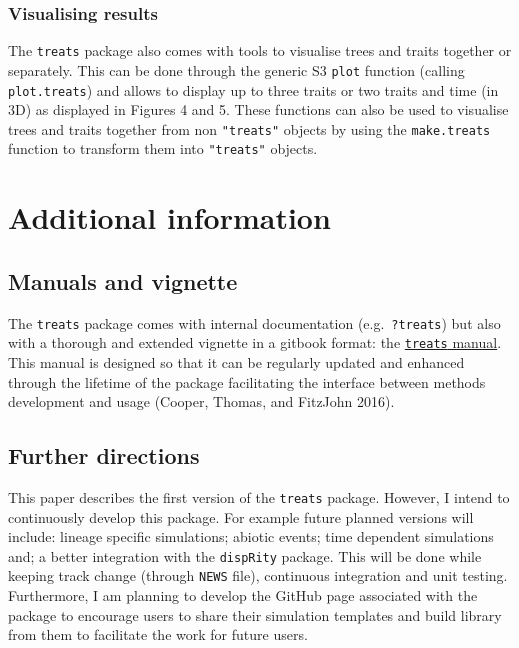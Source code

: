 \documentclass[
]{article}
\begin{document}
\hypertarget{visualising-results}{%
\subsubsection{Visualising results}\label{visualising-results}}

The \texttt{treats} package also comes with tools to visualise trees and
traits together or separately. This can be done through the generic S3
\texttt{plot} function (calling \texttt{plot.treats}) and allows to
display up to three traits or two traits and time (in 3D) as displayed
in Figures 4 and 5. These functions can also be used to visualise trees
and traits together from non \texttt{"treats"} objects by using the
\texttt{make.treats} function to transform them into \texttt{"treats"}
objects.

\hypertarget{additional-information}{%
\section{Additional information}\label{additional-information}}

\hypertarget{manuals-and-vignette}{%
\subsection{Manuals and vignette}\label{manuals-and-vignette}}

The \texttt{treats} package comes with internal documentation
(e.g.~\texttt{?treats}) but also with a thorough and extended vignette
in a gitbook format: the
\href{http://tguillerme.github.io/treats.html}{\texttt{treats} manual}.
This manual is designed so that it can be regularly updated and enhanced
through the lifetime of the package facilitating the interface between
methods development and usage (Cooper, Thomas, and FitzJohn 2016).

\hypertarget{further-directions}{%
\subsection{Further directions}\label{further-directions}}

This paper describes the first version of the \texttt{treats} package.
However, I intend to continuously develop this package. For example
future planned versions will include: lineage specific simulations;
abiotic events; time dependent simulations and; a better integration
with the \texttt{dispRity} package. This will be done while keeping
track change (through \texttt{NEWS} file), continuous integration and
unit testing. Furthermore, I am planning to develop the GitHub page
associated with the package to encourage users to share their simulation
templates and build library from them to facilitate the work for future
users.
\end{document}
